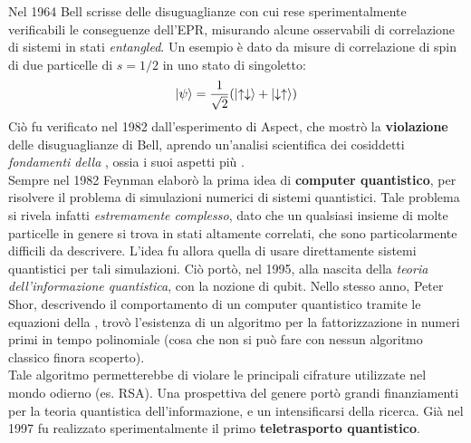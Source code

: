\documentclass[../../InformazioneQuantistica.tex]{subfiles}
\begin{document}
Nel 1964 Bell scrisse delle disuguaglianze con cui rese sperimentalmente verificabili le conseguenze dell'EPR, misurando alcune osservabili di correlazione di sistemi in stati \textit{entangled}. Un esempio è dato da misure di correlazione di spin di due particelle di $s=1/2$ in uno stato di singoletto:
\begin{align*}
\Ket{\psi} = \frac{1}{\sqrt{2}}(\Ket{\uparrow\downarrow}+\Ket{\downarrow \uparrow})
\end{align*}
Ciò fu verificato nel 1982 dall'esperimento di Aspect, che mostrò la \textbf{violazione} delle disuguaglianze di Bell, aprendo un'analisi scientifica dei cosiddetti \textit{fondamenti della \MQ}, ossia i suoi aspetti più .\\
Sempre nel 1982 Feynman elaborò la prima idea di \textbf{computer quantistico}, per risolvere il problema di simulazioni numerici di sistemi quantistici. Tale problema si rivela infatti \textit{estremamente complesso}, dato che un qualsiasi insieme di molte particelle in genere si trova in stati altamente correlati, che sono particolarmente difficili da descrivere. L'idea fu allora quella di usare direttamente sistemi quantistici per tali simulazioni. Ciò portò, nel 1995, alla nascita della \textit{teoria dell'informazione quantistica}, con la nozione di qubit. Nello stesso anno, Peter Shor, descrivendo il comportamento di un computer quantistico tramite le equazioni della \MQ, trovò l'esistenza di un algoritmo per la fattorizzazione in numeri primi in tempo polinomiale (cosa che non si può fare con nessun algoritmo classico finora scoperto).\\
Tale algoritmo permetterebbe di violare le principali cifrature utilizzate nel mondo odierno (es. RSA). Una prospettiva del genere portò grandi finanziamenti per la teoria quantistica dell'informazione, e un intensificarsi della ricerca. Già nel 1997 fu realizzato sperimentalmente il primo \textbf{teletrasporto quantistico}.\\
\end{document}

